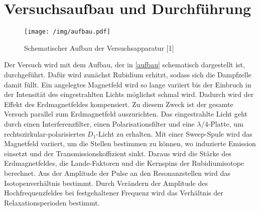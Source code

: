\section{Versuchsaufbau und Durchführung}

\begin{figure}[h]
\centering
\texttt{[image: /img/aufbau.pdf]}
\caption{Schematischer Aufbau der Versuchsapparatur [1]}
\label{aufbau}
\end{figure}

Der Versuch wird mit dem Aufbau, der in \autoref{aufbau} schematisch dargestellt ist, durchgeführt. Dafür wird zunächst
Rubidium erhitzt, sodass sich die Dampfzelle damit füllt. Ein angelegtes Magnetfeld wird so lange variiert bis der Einbruch
in der Intensität des eingestrahlten Lichts möglichst schmal wird. Dadurch wird der Effekt des Erdmagnetfeldes kompensiert.
Zu diesem Zweck ist der gesamte Versuch parallel zum Erdmagnetfeld auszurichten. Das eingestrahlte Licht geht durch einen
Interferenzfilter, einen Polarisationsfilter und eine $\lambda/4$-Platte, um rechtszirkular-polarisiertes $D_1$-Licht zu
erhalten. Mit einer Sweep-Spule wird das Magnetfeld variiert, um die Stellen bestimmen zu können, wo induzierte Emission
einsetzt und der Transmissionskoffizient sinkt. Daraus wird die Stärke des Erdmagnetfeldes, die Lande-Faktoren und die
Kernspins der Rubidiumisotope berechnet. Aus der Amplitude der Pulse an den Resonanzstellen wird das Isotopenverhältnis
bestimmt. Durch Verändern der Amplitude des Hochfrequenzfeldes bei festgehaltener Frequenz wird das Verhältnis der
Relaxationsperioden bestimmt.
